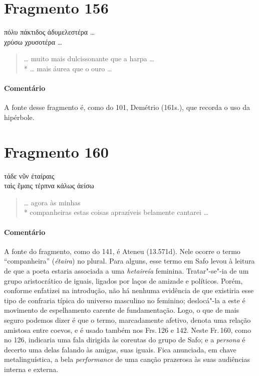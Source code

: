 \section{Fragmento 156}

\begin{gkverse}
πόλυ πάκτιδος ἀδυμελεστέρα \ldots{}\\
χρύσω χρυσοτέρα \ldots{}
\end{gkverse}

\begin{verse}
\ldots{} muito mais dulcissonante que a harpa \ldots{}\\*
\ldots{} mais áurea que o ouro \ldots{}
\end{verse}

{\paragraph{Comentário} A fonte desse fragmento é, como do 101, Demétrio (161s.), que recorda o uso da
hipérbole.}


\section{Fragmento 160}

\begin{gkverse}
τάδε νῦν ἐταίραις\\
ταὶς ἔμαις \dagger{}τέρπνα\dagger{} κάλως ἀείσω
\end{gkverse}

\begin{verse}
\ldots{} agora às minhas\\*
companheiras estas coisas aprazíveis belamente cantarei \ldots{}
\end{verse}

{\paragraph{Comentário} A fonte do fragmento, como do 141, é Ateneu (13.571d). Nele ocorre o termo ``companheira” (\textit{étaira}) no plural.
Para alguns, esse termo em Safo levou à leitura de que a poeta estaria associada a uma \textit{hetaireía} feminina. Tratar"-se"-ia de um grupo aristocrático de iguais, ligados por laços de amizade e políticos. Porém, conforme enfatizei na introdução, não há nenhuma evidência de que existiria esse tipo de confraria típica do universo masculino no feminino; deslocá"-la a este é movimento de espelhamento carente de fundamentação. Logo, o que de mais seguro podemos dizer é que o termo, marcadamente afetivo, denota uma relação amistosa entre coevos, e é usado também nos Frs.\,126 e 142. Neste Fr.\,160, como no 126, indicaria uma fala dirigida às coreutas do grupo de Safo; e a \textit{persona} é decerto uma delas falando às amigas, suas iguais. Fica anunciada, em chave metalinguística, a bela \textit{performance}
de uma canção prazerosa às suas audiências interna e externa.}


